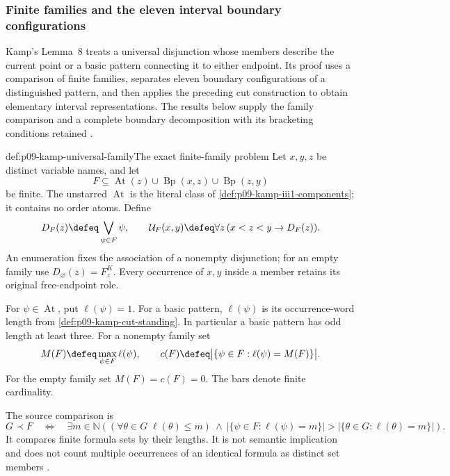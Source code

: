 
\subsubsection{Finite families and the eleven interval boundary configurations}
\label{sec:p09-kamp-iii2-lemma8-foundations}

Kamp's Lemma~8 treats a universal disjunction whose members describe
the current point or a basic pattern connecting it to either endpoint.
Its proof uses a comparison of finite families, separates eleven boundary
configurations of a distinguished pattern, and then applies the preceding
cut construction to obtain elementary interval representations. The results
below supply the family comparison and a complete boundary decomposition
with its bracketing conditions retained
\cite[ch.~III, lemma~8, pp.~83--92]{Kamp1968}.

\begin{hbdefinition}{def:p09-kamp-universal-family}{The exact finite-family problem}
Let \(x,y,z\) be distinct variable names, and let
\[
 F\subseteq\operatorname{At}(z)\cup
                   \operatorname{Bp}(x,z)\cup\operatorname{Bp}(z,y)
\]
be finite. The unstarred \(\operatorname{At}\) is the literal class
of \cref{def:p09-kamp-iii1-components}; it contains no order atoms.
Define
\[
 D_F(z)\defeq\bigvee_{\psi\in F}\psi,\qquad
 \mathcal U_F(x,y)\defeq\forall z\,(x<z<y\to D_F(z)).
\]
An enumeration fixes the association of a nonempty disjunction; for an
empty family use \(D_\varnothing(z)=F^K_z\). Every occurrence
of \(x,y\) inside a member retains its original free-endpoint role.

For \(\psi\in\operatorname{At}\), put \(\ell(\psi)=1\).
For a basic pattern, \(\ell(\psi)\) is its occurrence-word length
from \cref{def:p09-kamp-cut-standing}. In particular a basic pattern
has odd length at least three. For a nonempty family set
\[
 M(F)\defeq\max_{\psi\in F}\ell(\psi),\qquad
 c(F)\defeq\bigl|\{\psi\in F:\ell(\psi)=M(F)\}\bigr|.
\]
For the empty family set \(M(F)=c(F)=0\).
The bars denote finite cardinality.

The source comparison is
\[
 G\prec F\quad\Longleftrightarrow\quad
 \exists m\in\mathbb N\left(
   (\forall\theta\in G\;\ell(\theta)\leq m)\ \land\
   |\{\psi\in F:\ell(\psi)=m\}|>
   |\{\theta\in G:\ell(\theta)=m\}|
                        \right).
\]
It compares finite formula sets by their lengths. It is not semantic
implication and does not count multiple occurrences of an identical
formula as distinct set members
\cite[ch.~III, p.~83]{Kamp1968}.
\end{hbdefinition}

